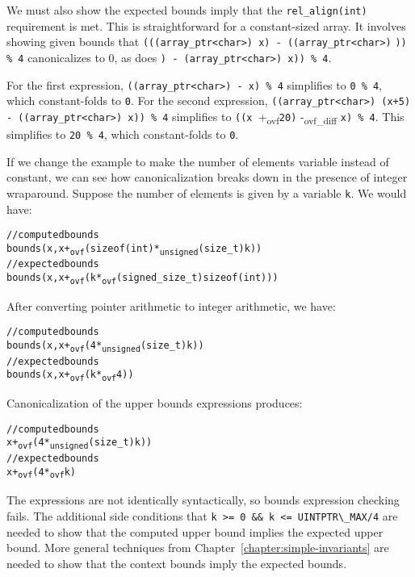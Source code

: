 We must also show the expected bounds imply that the 
\verb|rel_align(int)| requirement is met. This is straightforward for
a constant-sized array. It involves showing given bounds{}{}
that \verb|(((array_ptr<char>) x) - ((array_ptr<char>)| \verb|)) % 4| canonicalizes to 0, as does
\arrayptrchar {}\verb|) - (array_ptr<char>) x)) % 4|.

For the first expression, \verb|((array_ptr<char>) - x) % 4|
simplifies to \verb|0 % 4|, which constant-folds to \verb|0|. 
For the second expression, \verb|((array_ptr<char>) (x+5) - ((array_ptr<char>) x)) % 4|
simplifies to \verb|((x |+\textsubscript{ovf}\verb|20)| -\textsubscript{ovf\_diff} \verb|x) % 4|. This
simplifies to \verb|20 % 4|, which constant-folds to \verb|0|.


If we change the example to make the number of elements variable instead
of constant, we can see how canonicalization breaks down in the presence
of integer wraparound. Suppose the number of elements is given by a
variable \verb|k|. We would have:

\begin{alltt}
// computed bounds
bounds(x, x +\textsubscript{ovf} (sizeof(int) *\textsubscript{unsigned} (size\_t) k))
// expected bounds
bounds(x, x +\textsubscript{ovf} (k *\textsubscript{ovf} (signed\_size\_t) sizeof(int)))
\end{alltt}

After converting pointer arithmetic to integer arithmetic, we have:
\begin{alltt}
// computed bounds
bounds(x, x +\textsubscript{ovf} (4 *\textsubscript{unsigned} (size\_t) k))
// expected bounds
bounds(x, x +\textsubscript{ovf} (k *\textsubscript{ovf} 4))
\end{alltt}

Canonicalization of the upper bounds expressions produces:
\begin{alltt}
// computed bounds
x +\textsubscript{ovf} (4 *\textsubscript{unsigned} (size\_t) k))
// expected bounds
x +\textsubscript{ovf} (4 *\textsubscript{ovf} k)
\end{alltt}

The expressions are not identically syntactically, so bounds expression
checking fails. The additional side conditions that \verb|k >= 0 && k <= UINTPTR\_MAX/4|
are needed to show that the computed upper bound implies the expected upper bound. More
general techniques from Chapter~\ref{chapter:simple-invariants} are needed to show that the context
bounds imply the expected bounds.

